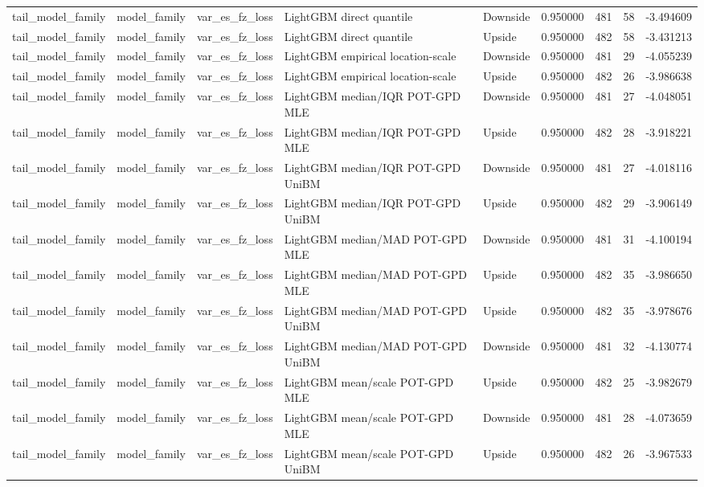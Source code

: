 \begin{tabular}{lllllrrr}
tail\_model\_family & model\_family & var\_es\_fz\_loss & LightGBM direct quantile & Downside & 0.950000 & 481 & 58 & -3.494609 \\
tail\_model\_family & model\_family & var\_es\_fz\_loss & LightGBM direct quantile & Upside & 0.950000 & 482 & 58 & -3.431213 \\
tail\_model\_family & model\_family & var\_es\_fz\_loss & LightGBM empirical location-scale & Downside & 0.950000 & 481 & 29 & -4.055239 \\
tail\_model\_family & model\_family & var\_es\_fz\_loss & LightGBM empirical location-scale & Upside & 0.950000 & 482 & 26 & -3.986638 \\
tail\_model\_family & model\_family & var\_es\_fz\_loss & LightGBM median/IQR POT-GPD MLE & Downside & 0.950000 & 481 & 27 & -4.048051 \\
tail\_model\_family & model\_family & var\_es\_fz\_loss & LightGBM median/IQR POT-GPD MLE & Upside & 0.950000 & 482 & 28 & -3.918221 \\
tail\_model\_family & model\_family & var\_es\_fz\_loss & LightGBM median/IQR POT-GPD UniBM & Downside & 0.950000 & 481 & 27 & -4.018116 \\
tail\_model\_family & model\_family & var\_es\_fz\_loss & LightGBM median/IQR POT-GPD UniBM & Upside & 0.950000 & 482 & 29 & -3.906149 \\
tail\_model\_family & model\_family & var\_es\_fz\_loss & LightGBM median/MAD POT-GPD MLE & Downside & 0.950000 & 481 & 31 & -4.100194 \\
tail\_model\_family & model\_family & var\_es\_fz\_loss & LightGBM median/MAD POT-GPD MLE & Upside & 0.950000 & 482 & 35 & -3.986650 \\
tail\_model\_family & model\_family & var\_es\_fz\_loss & LightGBM median/MAD POT-GPD UniBM & Upside & 0.950000 & 482 & 35 & -3.978676 \\
tail\_model\_family & model\_family & var\_es\_fz\_loss & LightGBM median/MAD POT-GPD UniBM & Downside & 0.950000 & 481 & 32 & -4.130774 \\
tail\_model\_family & model\_family & var\_es\_fz\_loss & LightGBM mean/scale POT-GPD MLE & Upside & 0.950000 & 482 & 25 & -3.982679 \\
tail\_model\_family & model\_family & var\_es\_fz\_loss & LightGBM mean/scale POT-GPD MLE & Downside & 0.950000 & 481 & 28 & -4.073659 \\
tail\_model\_family & model\_family & var\_es\_fz\_loss & LightGBM mean/scale POT-GPD UniBM & Upside & 0.950000 & 482 & 26 & -3.967533 \\

\end{tabular}
